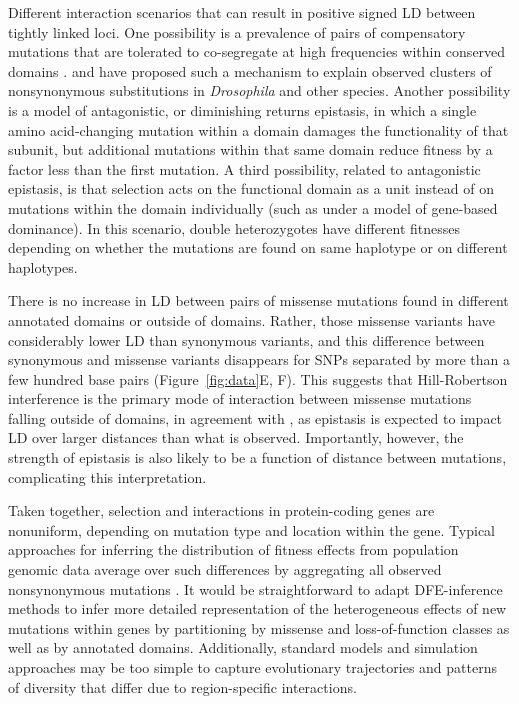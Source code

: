 \documentclass[]{article}
\begin{document}
Different interaction scenarios that can result in
positive signed LD between tightly linked loci. One possibility is a prevalence
of pairs of compensatory mutations that are tolerated to co-segregate at high
frequencies within conserved domains \citep{Yeang2007-gj,Ivankov2014-tn}.
\citet{Callahan2011-ac} and \citet{Taverner2020-lk} have proposed such a
mechanism to explain observed clusters of nonsynonymous substitutions in
\emph{Drosophila} and other species. Another possibility is a model of
antagonistic, or diminishing returns epistasis, in which a single amino
acid-changing mutation within a domain damages the functionality of that
subunit, but additional mutations within that same domain reduce fitness by a
factor less than the first mutation. A third possibility, related to
antagonistic epistasis, is that selection acts on the functional domain as a
unit instead of on mutations within the domain individually (such as under a
model of gene-based dominance). In this scenario, double heterozygotes have
different fitnesses depending on whether the mutations are found on same
haplotype or on different haplotypes.

There is no increase in LD between pairs of missense mutations found in
different annotated domains or outside of domains.
Rather, those missense variants have considerably
lower LD than synonymous variants, and this difference between synonymous and
missense variants disappears for SNPs separated by more than a
few hundred base pairs (Figure~\ref{fig:data}E, F). This suggests that
Hill-Robertson interference is the primary mode of interaction between missense
mutations falling outside of domains, in agreement with \citet{Garcia2021-zn},
as epistasis is expected to impact LD over larger distances than what is
observed. Importantly, however, the strength of epistasis is also likely to be
a function of distance between mutations, complicating this interpretation.

Taken together, selection and interactions in protein-coding genes are
nonuniform, depending on mutation type and location within the gene. Typical
approaches for inferring the distribution of fitness effects from population
genomic data average over such differences by aggregating all observed
nonsynonymous mutations \citep{Boyko2008-zk,Kim2017-xo}. It would be
straightforward to adapt DFE-inference methods to infer more detailed
representation of the heterogeneous effects of new mutations within genes by
partitioning by missense and loss-of-function classes as well as by annotated
domains. Additionally, standard models and simulation approaches may be too
simple to capture evolutionary trajectories and patterns of diversity that
differ due to region-specific interactions.
\end{document}
